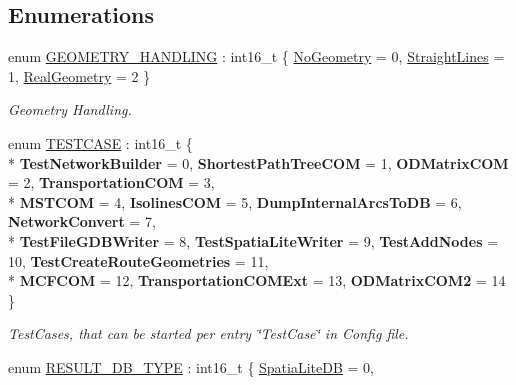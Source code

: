 \subsection*{Enumerations}
\begin{DoxyCompactItemize}
\item 
enum \hyperlink{namespacenetxpert_1_1cnfg_a1514d3ae51414bf0bcd8d1fe8e868b89}{G\+E\+O\+M\+E\+T\+R\+Y\+\_\+\+H\+A\+N\+D\+L\+I\+NG} \+: int16\+\_\+t \{ \hyperlink{namespacenetxpert_1_1cnfg_a1514d3ae51414bf0bcd8d1fe8e868b89af3fbb8ce1cd136e1fa5bc3645ec6c4d9}{No\+Geometry} = 0, 
\hyperlink{namespacenetxpert_1_1cnfg_a1514d3ae51414bf0bcd8d1fe8e868b89a275f920bcb17d14a1c719ff82804cc96}{Straight\+Lines} = 1, 
\hyperlink{namespacenetxpert_1_1cnfg_a1514d3ae51414bf0bcd8d1fe8e868b89a76d3f1e484baac8836d480cec7faaf96}{Real\+Geometry} = 2
 \}\begin{DoxyCompactList}\small\item\em Geometry Handling. \end{DoxyCompactList}
\item 
enum \hyperlink{namespacenetxpert_1_1cnfg_ae473d83baf6d2ee9328c66364eefc8df}{T\+E\+S\+T\+C\+A\+SE} \+: int16\+\_\+t \{ \\*
{\bfseries Test\+Network\+Builder} = 0, 
{\bfseries Shortest\+Path\+Tree\+C\+OM} = 1, 
{\bfseries O\+D\+Matrix\+C\+OM} = 2, 
{\bfseries Transportation\+C\+OM} = 3, 
\\*
{\bfseries M\+S\+T\+C\+OM} = 4, 
{\bfseries Isolines\+C\+OM} = 5, 
{\bfseries Dump\+Internal\+Arcs\+To\+DB} = 6, 
{\bfseries Network\+Convert} = 7, 
\\*
{\bfseries Test\+File\+G\+D\+B\+Writer} = 8, 
{\bfseries Test\+Spatia\+Lite\+Writer} = 9, 
{\bfseries Test\+Add\+Nodes} = 10, 
{\bfseries Test\+Create\+Route\+Geometries} = 11, 
\\*
{\bfseries M\+C\+F\+C\+OM} = 12, 
{\bfseries Transportation\+C\+O\+M\+Ext} = 13, 
{\bfseries O\+D\+Matrix\+C\+O\+M2} = 14
 \}\hypertarget{namespacenetxpert_1_1cnfg_ae473d83baf6d2ee9328c66364eefc8df}{}\label{namespacenetxpert_1_1cnfg_ae473d83baf6d2ee9328c66364eefc8df}
\begin{DoxyCompactList}\small\item\em Test\+Cases, that can be started per entry \char`\"{}\+Test\+Case\char`\"{} in Config file. \end{DoxyCompactList}
\item 
enum \hyperlink{namespacenetxpert_1_1cnfg_a235b32f52360f5f331279b34e85064a5}{R\+E\+S\+U\+L\+T\+\_\+\+D\+B\+\_\+\+T\+Y\+PE} \+: int16\+\_\+t \{ \hyperlink{namespacenetxpert_1_1cnfg_a235b32f52360f5f331279b34e85064a5a26c69a0027fcd7eeb815ce199810bbc3}{Spatia\+Lite\+DB} = 0, 

\end{DoxyCompactItemize}

